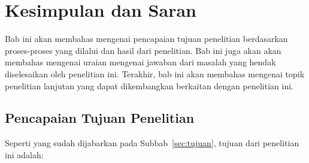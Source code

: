 \chapter{Kesimpulan dan Saran}
\label{chap:kesimpulan}

Bab ini akan membahas mengenai pencapaian tujuan penelitian berdasarkan proses-proses yang dilalui dan hasil dari penelitian. Bab ini juga akan akan membahas mengenai uraian mengenai jawaban dari masalah yang hendak diselesaikan oleh penelitian ini. Terakhir, bab ini akan membahas mengenai topik penelitian lanjutan yang dapat dikembangkan berkaitan dengan penelitian ini.

\section{Pencapaian Tujuan Penelitian}
\label{sec:pencapaian-tujuan}

Seperti yang sudah dijabarkan pada Subbab~\ref{sec:tujuan}, tujuan dari penelitian ini adalah:

